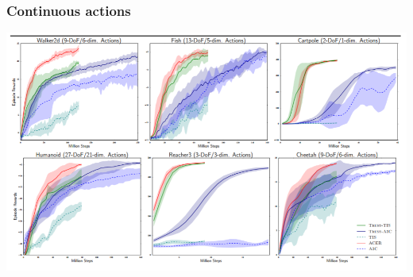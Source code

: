 \documentclass{beamer}
\begin{document}
\begin{frame}
\frametitle{Continuous actions}
\begin{center}
\includegraphics[scale=0.34]{mujoco}
\end{center}
\end{frame}
\end{document}
